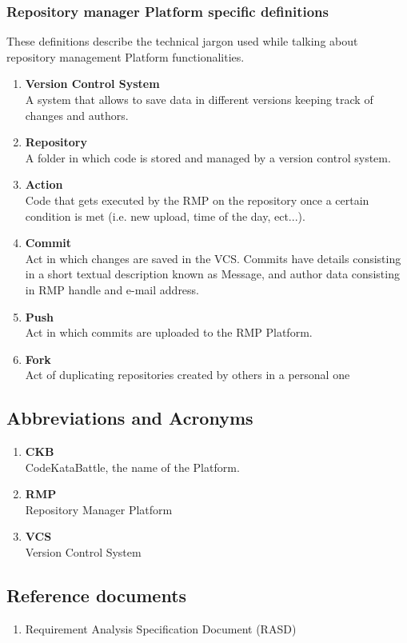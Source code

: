 \subsubsection[short]{Repository manager Platform specific definitions}
These definitions describe the technical jargon used while talking about repository management Platform functionalities.
\begin{enumerate}[label=$\bullet$]
    \item \textbf{Version Control System}\\A system that allows to save data in different versions keeping track of changes and authors.
    \item \textbf{Repository}\\A folder in which code is stored and managed by a version control system.
    \item \textbf{Action}\\Code that gets executed by the RMP on the repository once a certain condition is met (i.e. new upload, time of the day, ect...).
    \item \textbf{Commit}\\Act in which changes are saved in the VCS. Commits have details consisting in a short textual description known as Message, and author data consisting in RMP handle and e-mail address.
    \item \textbf{Push}\\Act in which commits are uploaded to the RMP Platform.
    \item \textbf{Fork}\\Act of duplicating repositories created by others in a personal one
\end{enumerate}
\subsection{Abbreviations and Acronyms}
\begin{enumerate}[label=$\bullet$]
    \item \textbf{CKB}\\CodeKataBattle, the name of the Platform.
    \item \textbf{RMP}\\Repository Manager Platform
    \item \textbf{VCS}\\Version Control System
\end{enumerate}
\subsection{Reference documents}
\begin{enumerate}[label=$\bullet$]
    \item Requirement Analysis Specification Document (RASD)
\end{enumerate}

